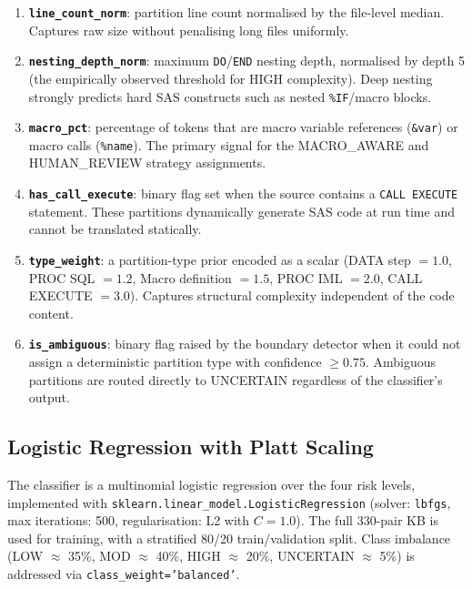 \begin{enumerate}
  \item \textbf{\texttt{line\_count\_norm}}: partition line count normalised by
    the file-level median. Captures raw size without penalising long files
    uniformly.
  \item \textbf{\texttt{nesting\_depth\_norm}}: maximum \texttt{DO}/\texttt{END}
    nesting depth, normalised by depth 5 (the empirically observed threshold for
    HIGH complexity). Deep nesting strongly predicts hard SAS constructs such as
    nested \texttt{\%IF}/macro blocks.
  \item \textbf{\texttt{macro\_pct}}: percentage of tokens that are macro variable
    references (\texttt{\&var}) or macro calls (\texttt{\%name}). The primary
    signal for the MACRO\_AWARE and HUMAN\_REVIEW strategy assignments.
  \item \textbf{\texttt{has\_call\_execute}}: binary flag set when the source
    contains a \texttt{CALL EXECUTE} statement. These partitions dynamically
    generate SAS code at run time and cannot be translated statically.
  \item \textbf{\texttt{type\_weight}}: a partition-type prior encoded as a scalar
    (DATA step $= 1.0$, PROC SQL $= 1.2$, Macro definition $= 1.5$, PROC IML
    $= 2.0$, CALL EXECUTE $= 3.0$). Captures structural complexity independent
    of the code content.
  \item \textbf{\texttt{is\_ambiguous}}: binary flag raised by the boundary
    detector when it could not assign a deterministic partition type with
    confidence $\geq 0.75$. Ambiguous partitions are routed directly to UNCERTAIN
    regardless of the classifier's output.
\end{enumerate}

\subsection{Logistic Regression with Platt Scaling}
\label{subsec:platt-impl}

The classifier is a multinomial logistic regression over the four risk levels,
implemented with \texttt{sklearn.linear\_model.LogisticRegression} (solver:
\texttt{lbfgs}, max iterations: 500, regularisation: L2 with $C=1.0$). The
full 330-pair KB is used for training, with a stratified 80/20 train/validation
split. Class imbalance (LOW $\approx$ 35\%, MOD $\approx$ 40\%, HIGH $\approx$
20\%, UNCERTAIN $\approx$ 5\%) is addressed via \texttt{class\_weight='balanced'}.

